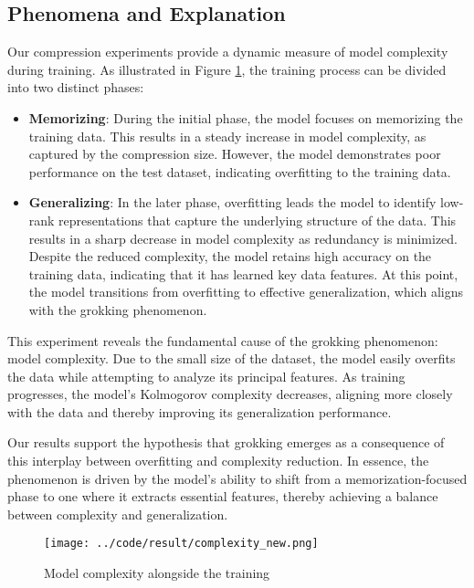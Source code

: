 \documentclass{article}
\begin{document}
\subsection{Phenomena and Explanation}

Our compression experiments provide a dynamic measure of model complexity during training. As illustrated in Figure \ref{fig:complexity}, the training process can be divided into two distinct phases:

\begin{itemize}
    \item \textbf{Memorizing}: During the initial phase, the model focuses on memorizing the training data. This results in a steady increase in model complexity, as captured by the compression size. However, the model demonstrates poor performance on the test dataset, indicating overfitting to the training data.
    \item \textbf{Generalizing}: In the later phase, overfitting leads the model to identify low-rank representations that capture the underlying structure of the data. This results in a sharp decrease in model complexity as redundancy is minimized. Despite the reduced complexity, the model retains high accuracy on the training data, indicating that it has learned key data features. At this point, the model transitions from overfitting to effective generalization, which aligns with the grokking phenomenon.
\end{itemize}

This experiment reveals the fundamental cause of the grokking phenomenon: model complexity. Due to the small size of the dataset, the model easily overfits the data while attempting to analyze its principal features. As training progresses, the model's Kolmogorov complexity decreases, aligning more closely with the data and thereby improving its generalization performance.

Our results support the hypothesis that grokking emerges as a consequence of this interplay between overfitting and complexity reduction. In essence, the phenomenon is driven by the model's ability to shift from a memorization-focused phase to one where it extracts essential features, thereby achieving a balance between complexity and generalization.

\begin{figure}[ht]
    \centering
    \texttt{[image: ../code/result/complexity\_new.png]}
    \caption{Model complexity alongside the training}
    \label{fig:complexity}
\end{figure}
\end{document}
